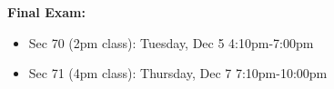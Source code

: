 \documentclass[letterpaper,12pt]{report}
\begin{document}
\vskip10pt
\textbf{Final Exam:}
\begin{itemize}
\item Sec 70 (2pm class): Tuesday, Dec 5 4:10pm-7:00pm
\item Sec 71 (4pm class): Thursday, Dec 7 7:10pm-10:00pm
\end{itemize}
\end{document}
